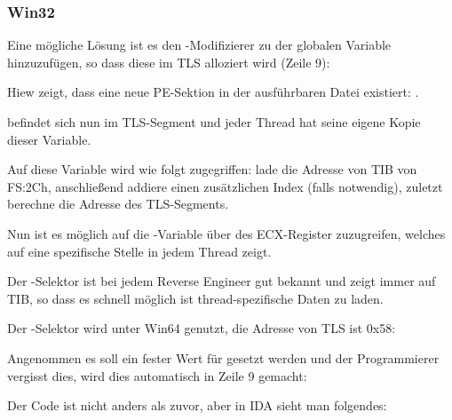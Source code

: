 \subsubsection{Win32}


Eine mögliche Lösung ist es den -Modifizierer zu der
globalen Variable hinzuzufügen, so dass diese im \ac{TLS} alloziert wird (Zeile 9):



Hiew zeigt, dass eine neue PE-Sektion in der ausführbaren Datei existiert: .



 befindet sich nun im \ac{TLS}-Segment und jeder Thread hat seine eigene Kopie dieser Variable.

Auf diese Variable wird wie folgt zugegriffen: lade die Adresse von \ac{TIB} von FS:2Ch,
anschließend addiere einen zusätzlichen Index (falls notwendig),
zuletzt berechne die Adresse des \ac{TLS}-Segments.

Nun ist es möglich auf die -Variable über des ECX-Register zuzugreifen,
welches auf eine spezifische Stelle in jedem Thread zeigt.


Der -Selektor ist bei jedem Reverse Engineer gut bekannt und zeigt immer auf \ac{TIB},
so dass es schnell möglich ist thread-spezifische Daten zu laden.


Der -Selektor wird unter Win64 genutzt, die Adresse von \ac{TLS} ist 0x58:




Angenommen es soll ein fester Wert für  gesetzt werden und der Programmierer vergisst dies,
wird dies automatisch in Zeile 9 gemacht:



Der Code ist nicht anders als zuvor, aber in IDA sieht man folgendes:

